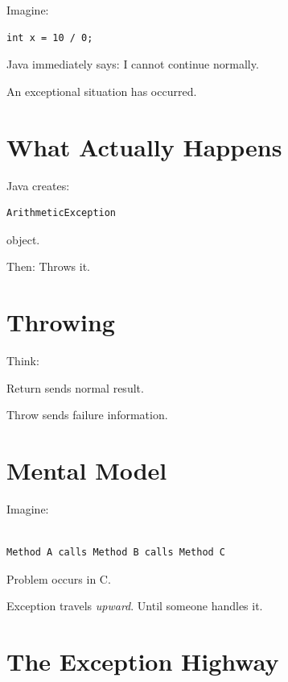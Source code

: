\documentclass[11pt,a4paper]{book}
\begin{document}
Imagine:

\begin{verbatim} 
int x = 10 / 0;
\end{verbatim}

Java immediately says:
I cannot continue normally.

An exceptional situation
has occurred.

\section{What Actually Happens}

Java creates:

\begin{verbatim} 
ArithmeticException
\end{verbatim}

object.

Then:
\textcolor{RosettaRoyalPurple}{Throws} it.

\section{Throwing}

Think:

\textcolor{RosettaRoyalPurple}{Return}
sends normal result.

\textcolor{RosettaRoyalPurple}{Throw}
sends failure information.

\section{Mental Model}

Imagine:

\begin{verbatim}

Method A calls Method B calls Method C

\end{verbatim}

Problem occurs in C.

Exception travels \emph{upward}. 
Until someone handles it.

\section{The Exception Highway}
\end{document}

